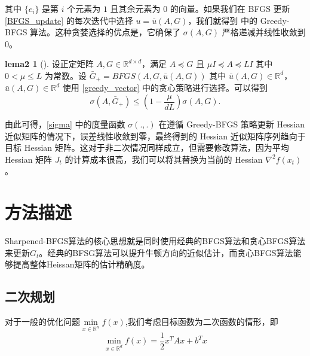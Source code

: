 \documentclass[a4paper,twoside,AutoFakeBold]{article}
\theoremstyle{definition}
\newtheorem{lema2}{{lema2}}
\begin{document}
其中 $\{e_i\}$ 是第 $i$ 个元素为 $1$ 且其余元素为 $0$ 的向量。如果我们在 BFGS 更新 \eqref{BFGS_update} 的每次迭代中选择 $u = \bar{u}(A, G)$，我们就得到 \cite{rodomanov2020greedy} 中的 Greedy-BFGS 算法。这种贪婪选择的优点是，它确保了 $\sigma(A, G)$ 严格递减并线性收敛到 $0$。

\begin{lema2}[\cite{rodomanov2020greedy}]\label{lema2_BFGS_greedy}
    设正定矩阵 $A, G \in \mathbb{R}^{d \times d}$，满足 $A \preceq G$ 且 $ \mu I \preceq A \preceq LI$ 其中 $0 < \mu \leq L$ 为常数。设 $\bar{G}_{+} = BFGS(A, G, \bar{u}(A, G))$ 其中 $\bar{u}(A, G) \in \mathbb{R}^d$，$\bar{u}(A, G) \in \mathbb{R}^d$ 使用 \eqref{greedy_vector} 中的贪心策略进行选择。可以得到
    \begin{equation}\label{lema2_BFGS_greedy_1}
        \sigma(A, \bar{G}_{+}) \leq \left(1 - \frac{\mu}{dL}\right)\sigma(A, G).
    \end{equation}
\end{lema2}

由此可得，\eqref{sigma} 中的度量函数 $\sigma(.,.)$ 在遵循 Greedy-BFGS 策略更新 Hessian 近似矩阵的情况下，误差线性收敛到零，最终得到的 Hessian 近似矩阵序列趋向于目标 Hessian 矩阵。这对于非二次情况同样成立，但需要修改算法，因为平均 Hessian 矩阵 $J_t$ 的计算成本很高，我们可以将其替换为当前的 Hessian $\nabla^2 f(x_t)$。

%
\section{方法描述}\label{section:methods}

Sharpened-BFGS算法的核心思想就是同时使用经典的BFGS算法和贪心BFGS算法来更新$G_t$。经典的BFSG算法可以提升牛顿方向的近似估计，而贪心BFGS算法能够提高整体Heissan矩阵的估计精确度。

\subsection{二次规划}

对于一般的优化问题$\mathop{\min}\limits_{x\in\mathbb{R}^n}f(x)$,我们考虑目标函数为二次函数的情形，即
\begin{equation}
    \mathop{\min}\limits_{x\in\mathbb{R}^d}f(x)=\frac{1}{2}x^TAx+b^Tx
\end{equation}
\end{document}
